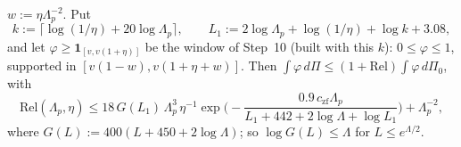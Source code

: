 \begin{theorem}
\begin{enumerate}[label=\textup{(\roman*)}]
  $w:=\eta\Lambda_p^{-2}$. Put
  \[
    k:=\big\lceil\log(1/\eta)+20\log\Lambda_p\big\rceil,\qquad L_1:=2\log\Lambda_p+\log(1/\eta)+\log k+3.08 ,
  \]
  and let $\varphi\ge\mathbf 1_{[v,v(1+\eta)]}$ be the window of Step~10 (built with this $k$): $0\le\varphi\le1$, supported in
  $[v(1-w),v(1+\eta+w)]$. Then $\int\varphi\,d\Pi\le(1+\mathrm{Rel})\int\varphi\,d\Pi_0$, with
  \begin{equation}\label{eq:lpplus}
    \mathrm{Rel}(\Lambda_p,\eta)\le18\,G(L_1)\,\Lambda_p^3\,\eta^{-1}\exp\Big(-\frac{0.9\,c_{\mathrm{zf}}\Lambda_p}{L_1+442+2\log\Lambda+\log L_1}\Big)
    +\Lambda_p^{-2},
  \end{equation}
  where $G(L):=400(L+450+2\log\Lambda)$; so $\log G(L)\le\Lambda$ for $L\le e^{\Lambda/2}$.
\end{enumerate}
\end{theorem}

